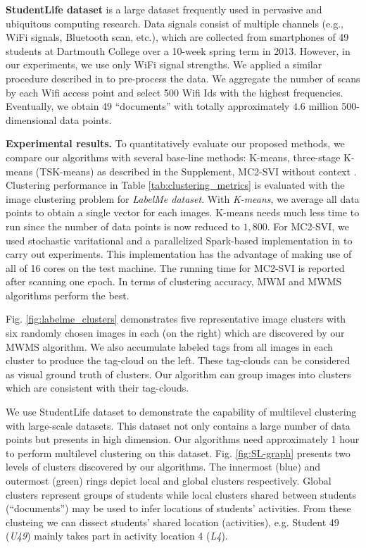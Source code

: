 \textbf{StudentLife dataset} is a large dataset frequently
used in pervasive and ubiquitous computing research. Data signals consist of
multiple channels  (e.g., WiFi signals, Bluetooth scan, etc.), which are
collected from smartphones of 49 students at Dartmouth
College over a 10-week spring term in 2013. However, in our experiments,
we use only WiFi signal strengths. We applied a similar procedure
described in \cite{nguyen_nguyen_venkatesh_phung_icpr16mcnc} to pre-process the
data. We aggregate the number of scans by each Wifi access point and
select 500 Wifi Ids with the highest frequencies. Eventually, we obtain
49 ``documents'' with totally approximately $4.6$ million 500-dimensional
data points.

\textbf{Experimental results.} To quantitatively evaluate our proposed
methods, we compare our algorithms with several base-line methods:
K-means, three-stage K-means (TSK-means) as described in the Supplement, 
MC2-SVI without context \cite{Viet-2016}. Clustering performance in Table
\ref{tab:clustering_metrics} is evaluated with the image clustering
problem for \emph{LabelMe dataset}. With \emph{K-means}, we
average all data points to obtain a single vector for each images.
K-means needs much less time to run since the number of data points
is now reduced to $1,800$. For MC2-SVI, we used stochastic varitational and 
a parallelized Spark-based implementation in \cite{Viet-2016} to carry out 
experiments. This implementation has the advantage of making use of all of 16 cores on the test machine. 
The running time for MC2-SVI is reported after scanning one epoch.
In terms of clustering accuracy, MWM and MWMS algorithms 
perform the best.

Fig. \ref{fig:labelme_clusters} demonstrates five representative
image clusters with six randomly chosen images in each (on the right)
which are discovered by our MWMS algorithm. We also accumulate labeled
tags from all images in each cluster to produce the tag-cloud on the
left. These tag-clouds can be considered as visual ground truth of
clusters. Our algorithm can group images into clusters which are consistent
with their tag-clouds.

We use StudentLife dataset to demonstrate the capability of multilevel
clustering with large-scale datasets. This dataset not only contains
a large number of data points but presents in high dimension. Our
algorithms need approximately 1 hour to perform multilevel
clustering on this dataset. Fig. \ref{fig:SL-graph} presents two
levels of clusters discovered by our algorithms. The innermost (blue)
and outermost (green) rings depict local and global clusters respectively.
Global clusters represent groups of students while local clusters
shared between students (``documents'') may be used to infer
locations of students' activities. From these clusteing we can dissect
students' shared location (activities), e.g. Student 49 (\emph{U49})
mainly takes part in activity location 4 (\emph{L4}). 
